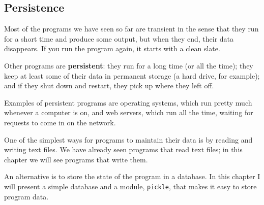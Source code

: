 \documentclass{article}
\begin{document}
\subsection{Persistence}
Most of the programs we have seen so far are transient in the sense
that they run for a short time and produce some output, but when they
end, their data disappears. If you run the program again, it starts
with a clean slate.
\par Other programs are \textbf{persistent}: they run for a long time
(or all the time);
they keep at least some of their data in permanent storage (a
hard drive, for example); and if they shut down and restart, they pick
up where they left off.
\par Examples of persistent programs are operating systems, which run
pretty much whenever a computer is on, and web servers, which run all
the time, waiting for requests to come in on the network.
\par One of the simplest ways for programs to maintain their data is by
reading and writing text files. We have already seen programs that
read text files; in this chapter we will see programs that write them.
\par An alternative is to store the state of the program in a database. In
this chapter I will present a simple database and a module,
\verb|pickle|,
that makes it easy to store program data.
\end{document}
